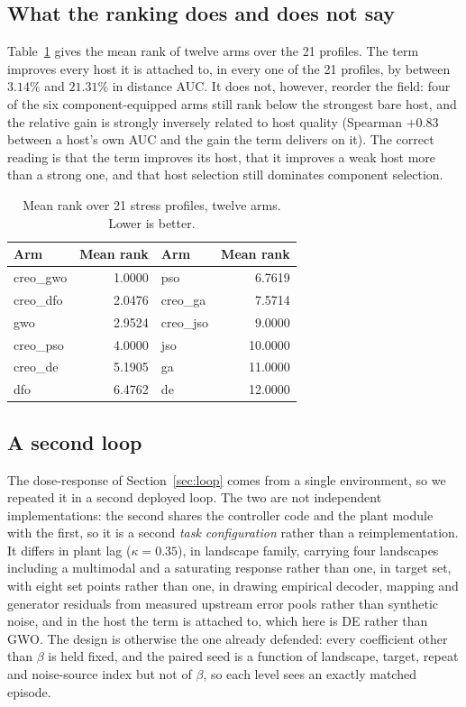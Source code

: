 \documentclass[11pt,a4paper]{article}
\begin{document}
\subsection{What the ranking does and does not say}

Table~\ref{tab:rank} gives the mean rank of twelve arms over the 21 profiles. The term
improves every host it is attached to, in every one of the 21 profiles, by between
$3.14\%$ and $21.31\%$ in distance AUC. It does not, however, reorder the
field: four of the six component-equipped arms still rank below the strongest bare host,
and the relative gain is strongly inversely related to host quality (Spearman $+0.83$
between a host's own AUC and the gain the term delivers on it). The correct reading is
that the term improves its host, that it improves a weak host more than a strong one, and
that host selection still dominates component selection.

\begin{table}[htbp]
\centering
\small
\caption{Mean rank over 21 stress profiles, twelve arms. Lower is better.}
\label{tab:rank}
\begin{tabular}{lrlr}
\toprule
Arm & Mean rank & Arm & Mean rank \\
\midrule
creo\_gwo & 1.0000 & pso & 6.7619 \\
creo\_dfo & 2.0476 & creo\_ga & 7.5714 \\
gwo & 2.9524 & creo\_jso & 9.0000 \\
creo\_pso & 4.0000 & jso & 10.0000 \\
creo\_de & 5.1905 & ga & 11.0000 \\
dfo & 6.4762 & de & 12.0000 \\
\bottomrule
\end{tabular}
\end{table}

\subsection{A second loop}
\label{sec:loop2}

The dose-response of Section~\ref{sec:loop} comes from a single environment, so we repeated
it in a second deployed loop. The two are not independent implementations: the second
shares the controller code and the plant module with the first, so it is a second
\emph{task configuration} rather than a reimplementation. It differs in plant lag
($\kappa = 0.35$), in landscape family, carrying four landscapes including a multimodal and
a saturating response rather than one, in target set, with eight set points rather than
one, in drawing empirical decoder, mapping and generator residuals from measured upstream
error pools rather than synthetic noise, and in the host the term is attached to, which
here is DE rather than GWO. The design is otherwise the one already defended: every
coefficient other than $\beta$ is held fixed, and the paired seed is a function of
landscape, target, repeat and noise-source index but not of $\beta$, so each level sees an
exactly matched episode.
\end{document}
